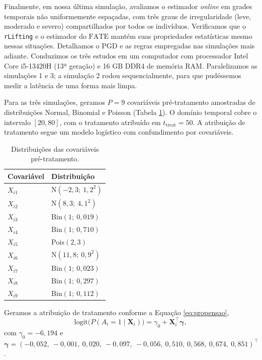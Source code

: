 Finalmente, em nossa última simulação, avaliamos o estimador \emph{online} em grades temporais não uniformemente espaçadas, com três graus de irregularidade (leve, moderado e severo) compartilhados por todos os indivíduos.
Verificamos que o \texttt{rLifting} e o estimador do \(\mathrm{FATE}\) mantém suas propriedades estatísticas mesmo nessas situações.
Detalhamos o PGD e as regras empregadas nas simulações mais adiante.
Conduzimos os três estudos em um computador com processador Intel Core i5-13420H (13ª geração) e 16 GB DDR4 de memória RAM.
Paralelizamos as simulações 1 e 3; a simulação 2 rodou sequencialmente, para que pudéssemos medir a latência de uma forma mais limpa.

Para as três simulações, geramos \(P = 9\) covariáveis pré-tratamento amostradas de distribuições Normal, Binomial e Poisson (Tabela \ref{tab:parametros_pgd}). 
O domínio temporal cobre o intervalo \([20, 80]\), com o tratamento atribuído em \(t_{\mathrm{treat}} = 50\). 
A atribuição de tratamento segue um modelo logístico com confundimento por covariáveis.

\begin{table}[ht]
	\centering
	\caption{Distribuições das covariáveis pré-tratamento.}
	\label{tab:parametros_pgd}
	\begin{tabular}{ll}
		\toprule
		Covariável & Distribuição \\
		\midrule
		\(X_{i1}\) & \(\mathrm{N}(-2{,}3;\ 1{,}2^2)\) \\
		\(X_{i2}\) & \(\mathrm{N}(8{,}3;\ 4{,}1^2)\) \\
		\(X_{i3}\) & \(\mathrm{Bin}(1;\ 0{,}019)\) \\
		\(X_{i4}\) & \(\mathrm{Bin}(1;\ 0{,}710)\) \\
		\(X_{i5}\) & \(\mathrm{Pois}(2{,}3)\) \\
		\(X_{i6}\) & \(\mathrm{N}(11{,}8;\ 0{,}9^2)\) \\
		\(X_{i7}\) & \(\mathrm{Bin}(1;\ 0{,}023)\) \\
		\(X_{i8}\) & \(\mathrm{Bin}(1;\ 0{,}297)\) \\
		\(X_{i9}\) & \(\mathrm{Bin}(1;\ 0{,}112)\) \\
		\bottomrule
	\end{tabular}
\end{table}

Geramos a atribuição de tratamento conforme a Equação \ref{eq:propensao},
\begin{equation}\label{eq:propensao}
	\mathrm{logit}\bigl(P(A_i = 1 \mid \mathbf{X}_i)\bigr) = \gamma_0 + \mathbf{X}_i^\top \boldsymbol{\gamma},
\end{equation}
com \(\gamma_0 = -6{,}194\) e \(\boldsymbol{\gamma} = (-0{,}052,\ {-}0{,}001,\ 0{,}020,\ {-}0{,}097,\ {-}0{,}056,\ 0{,}510,\ 0{,}568,\ 0{,}674,\ 0{,}851)^\top\).

